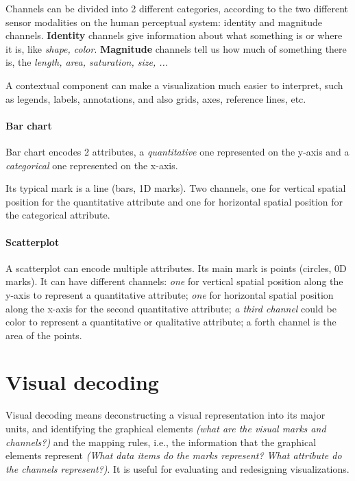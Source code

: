 Channels can be divided into 2 different categories, according to the two different sensor modalities on the human perceptual system: identity and magnitude channels. \textbf{Identity} channels give information about what something is or where it is, like \textit{shape, color}. \textbf{Magnitude} channels tell us how much of something there is, the \textit{length, area, saturation, size, ...}

\begin{definition}[Context]
    A contextual component can make a visualization much easier to interpret, such as legends, labels, annotations, and also grids, axes, reference lines, etc.
\end{definition}

\paragraph{Bar chart}
Bar chart encodes 2 attributes, a \emph{quantitative} one represented on the y-axis and a \emph{categorical} one represented on the x-axis.\par
Its typical mark is a line (bars, 1D marks). Two channels, one for vertical spatial position for the quantitative attribute and one for horizontal spatial position for the categorical attribute.

\paragraph{Scatterplot}
A scatterplot can encode multiple attributes. Its main mark is points (circles, 0D marks). It can have different channels: \textit{one} for vertical spatial position along the y-axis to represent a quantitative attribute; \textit{one} for horizontal spatial position along the x-axis for the second quantitative attribute; \textit{a third channel} could be color to represent a quantitative or qualitative attribute; a forth channel is the area of the points.

\section{Visual decoding}
Visual decoding means deconstructing a visual representation into its major units, and identifying the graphical elements \textit{(what are the visual marks and channels?)} and the mapping rules, i.e., the information that the graphical elements represent \textit{(What data items do the marks represent? What attribute do the channels represent?)}. It is useful for evaluating and redesigning visualizations.\par

